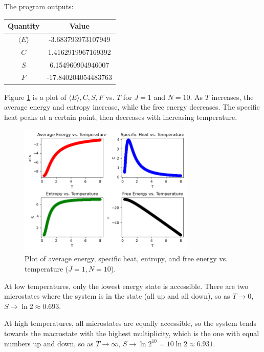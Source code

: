 \documentclass{article}
\begin{document}
\clearpage

\problem
The program outputs:
\begin{center}
    \begin{tabular}{|c|c|}
        \hline
        Quantity & Value \\
        \hline
        $\langle E \rangle$ & -3.683793973107949  \\
        \hline
        $C$ & 1.4162919967169392 \\
        \hline
        $S$ & 6.154960904946007 \\
        \hline
        $F$ & -17.840204054483763 \\
        \hline
    \end{tabular}
\end{center}

\clearpage

\problem
Figure \ref{fig:fig1} is a plot of $\langle E \rangle, C, S, F$ vs. $T$ for $J = 1$ and $N = 10$. As $T$ increases, the average energy and entropy increase, while the free energy decreases. The specific heat peaks at a certain point, then decreases with increasing temperature.
    
\begin{figure}[!htb]
    \centering
    \includegraphics[width=0.75\textwidth]{../code/phy112l_lab3/3-4.png}
    \caption{Plot of average energy, specific heat, entropy, and free energy vs. temperature ($J = 1, N = 10$).}
    \label{fig:fig1}
\end{figure}
\clearpage

\problem
{}
At low temperatures, only the lowest energy state is accessible. There are two microstates where the system is in the state (all up and all down), so as $T \to 0$, $S \to \ln 2 \approx 0.693$.

At high temperatures, all microstates are equally accessible, so the system tends towards the macrostate with the highest multiplicity, which is the one with equal numbers up and down, so as $T \to \infty$, $S \to \ln 2^{10} = 10\ln 2 \approx 6.931$. 
\end{document}
